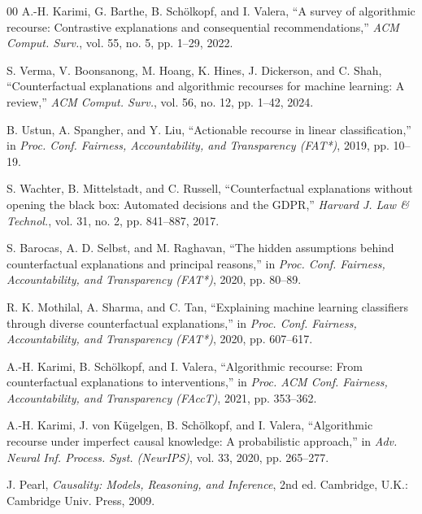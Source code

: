 \documentclass[nolineno]{paper/ieee-access/ieeeaccess}%
\begin{document}
\begin{thebibliography}{00}\setlength{\itemsep}{-2.5pt}\setlength{\parskip}{0pt}
A.-H. Karimi, G. Barthe, B. Sch{\"o}lkopf, and I. Valera,
``A survey of algorithmic recourse: Contrastive explanations and consequential recommendations,''
\emph{ACM Comput. Surv.}, vol. 55, no. 5, pp. 1--29, 2022.

S. Verma, V. Boonsanong, M. Hoang, K. Hines, J. Dickerson, and C. Shah,
``Counterfactual explanations and algorithmic recourses for machine learning: A review,''
\emph{ACM Comput. Surv.}, vol. 56, no. 12, pp. 1--42, 2024.

B. Ustun, A. Spangher, and Y. Liu,
``Actionable recourse in linear classification,''
in \emph{Proc. Conf. Fairness, Accountability, and Transparency (FAT*)}, 2019, pp. 10--19.

S. Wachter, B. Mittelstadt, and C. Russell,
``Counterfactual explanations without opening the black box: Automated decisions and the {GDPR},''
\emph{Harvard J. Law \& Technol.}, vol. 31, no. 2, pp. 841--887, 2017.

S. Barocas, A. D. Selbst, and M. Raghavan,
``The hidden assumptions behind counterfactual explanations and principal reasons,''
in \emph{Proc. Conf. Fairness, Accountability, and Transparency (FAT*)}, 2020, pp. 80--89.

R. K. Mothilal, A. Sharma, and C. Tan,
``Explaining machine learning classifiers through diverse counterfactual explanations,''
in \emph{Proc. Conf. Fairness, Accountability, and Transparency (FAT*)}, 2020, pp. 607--617.

A.-H. Karimi, B. Sch{\"o}lkopf, and I. Valera,
``Algorithmic recourse: From counterfactual explanations to interventions,''
in \emph{Proc. ACM Conf. Fairness, Accountability, and Transparency (FAccT)}, 2021, pp. 353--362.

A.-H. Karimi, J. von K{\"u}gelgen, B. Sch{\"o}lkopf, and I. Valera,
``Algorithmic recourse under imperfect causal knowledge: A probabilistic approach,''
in \emph{Adv. Neural Inf. Process. Syst. (NeurIPS)}, vol. 33, 2020, pp. 265--277.

J. Pearl,
\emph{Causality: Models, Reasoning, and Inference}, 2nd ed.
Cambridge, U.K.: Cambridge Univ. Press, 2009.


\end{thebibliography}
\end{document}
